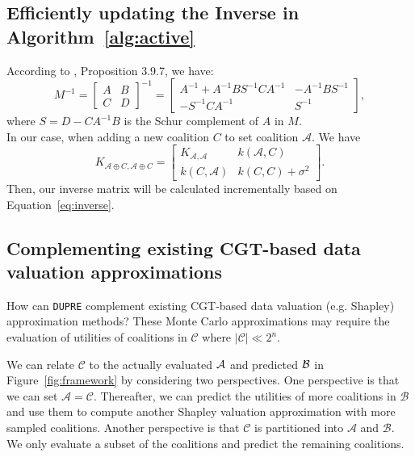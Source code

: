 \subsection{Efficiently updating the Inverse in  Algorithm~\ref{alg:active}\label{appdix:algo2}}
According to \citet{bernstein2009matrix}, Proposition 3.9.7, we have:
\begin{equation}\label{eq:inverse}
 M^{-1} = 
\begin{bmatrix}
A & B \\
C & D
\end{bmatrix}^{-1} = \begin{bmatrix}
A^{-1} + A^{-1} B S^{-1} C A^{-1} & -A^{-1} B S^{-1} \\
- S^{-1} C A^{-1} & S^{-1}
\end{bmatrix} , 
\end{equation}
where $S = D - C A^{-1} B$ is the Schur complement of $A$ in $M$.\\
In our case, when adding a new coalition $C$ to set coalition $\mathcal{A}$. We have
\[
K_{{\mathcal{A} \oplus C, \mathcal{A} \oplus C}} = \begin{bmatrix}
K_{\mathcal{A}, \mathcal{A}} & k(\mathcal{A}, C) \\
k(C, \mathcal{A}) & k(C,C) + \sigma^2
\end{bmatrix}.
\]
Then, our inverse matrix will be calculated incrementally based on Equation~\eqref{eq:inverse}.

\subsection{Complementing existing CGT-based data valuation approximations}\label{appdix:samp_algo}
How can \texttt{DUPRE} complement existing CGT-based data valuation (e.g. Shapley) approximation methods?
These Monte Carlo approximations may require the evaluation of utilities of coalitions in $\mathcal{C}$ where $|\mathcal{C}| \ll 2^n$.

We can relate $\mathcal{C}$ to the actually evaluated $\mathcal{A}$ and predicted $\mathcal{B}$ in Figure~\ref{fig:framework} by considering two perspectives. 
One perspective is that we can set $\mathcal{A} = \mathcal{C}$. Thereafter, we can predict the utilities of more coalitions in $\mathcal{B}$ and use them to compute another Shapley valuation approximation with more sampled coalitions.
Another perspective is that $\mathcal{C}$ is partitioned into $\mathcal{A}$ and $\mathcal{B}$. We only evaluate a subset of the coalitions and predict the remaining coalitions.

